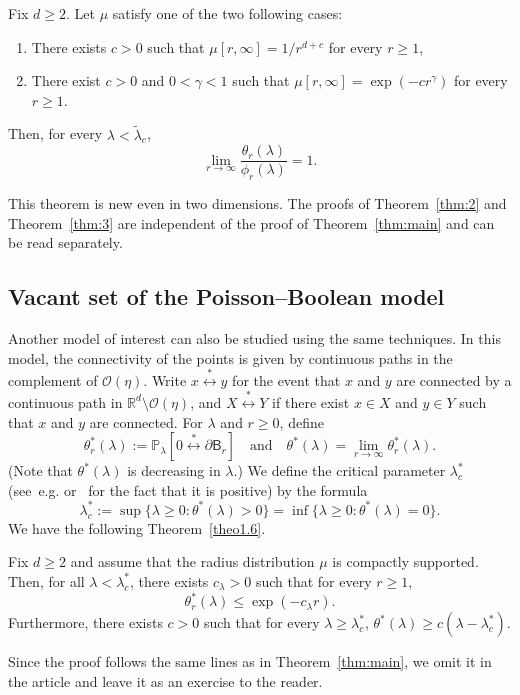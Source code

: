 \documentclass[AHL,Unicode,longabstracts]{cedram}
\newcommand*{\cenumi}{\renewcommand*{\theenumi}{C\arabic{enumi}}}
\begin{document}
\begin{theo}\label{thm:3}
Fix $d\ge2$. Let $\mu$ satisfy one of the two following cases:
\begin{enumerate}\cenumi
\item\label{C1}
There exists $c>0$ such that $\mu[r,\infty]=1/r^{d+c}$ for every $r\ge 1$,
\item\label{C2}
There exist $c>0$ and $0<\gamma<1$ such that $\mu[r,\infty]=\exp(-cr^{\gamma})$ for every $r\ge1$.
\end{enumerate}
Then, for every $\lambda<\widetilde\lambda_c$,
\[
\lim_{r\rightarrow\infty}\frac{\theta_r(\lambda)}{\phi_r(\lambda)}=1.
\]
\end{theo}

This theorem is new even in two dimensions. The proofs of Theorem~\ref{thm:2} and Theorem~\ref{thm:3} are independent of the proof of Theorem~\ref{thm:main} and can be read separately.

\subsection{Vacant set of the Poisson--Boolean model}
Another model of interest can also be studied using the same techniques. In this model, the connectivity of the points is given by continuous paths in the complement of ${\mathcal O}(\eta)$. Write $x\stackrel{*}{\longleftrightarrow}y$ for the event that $x$ and $y$ are connected by a continuous path in ${\mathbb R}^d\setminus{\mathcal O}(\eta)$, and $X\stackrel{*}{\longleftrightarrow}Y$ if there exist $x\in X $ and $y\in Y$ such that $x$ and $y$ are connected. For $\lambda$ and $r\ge0$, define
\[
\theta_r^*(\lambda):={\mathbb P}_\lambda[0\stackrel{*}\longleftrightarrow \partial\mathsf B_r]\quad\text{and}\quad\theta^*(\lambda)=\lim_{r\rightarrow\infty}\theta_r^*(\lambda).
\]
(Note that $\theta^*(\lambda)$ is decreasing in $\lambda$.) We define the critical parameter $\lambda_c^*$ (see~e.g. \cite{Pen17} or~\cite{ATT17} for the fact that it is positive) by the formula
\[
\lambda_c^*:=\sup\{\lambda\ge 0:\theta^*(\lambda)>0\}=\inf\{\lambda\ge 0:\theta^*(\lambda)=0\}.
\]
We have the following Theorem~\ref{theo1.6}.
\begin{theo}\label{theo1.6}
Fix $d\ge2$ and assume that the radius distribution $\mu$ is compactly supported. Then, for all $\lambda < \lambda_c^*$, there exists $c_\lambda >0$ such that for every $r\ge1$,
\[
\theta_r^*(\lambda) \leq \exp (-c_\lambda r).
\]
Furthermore, there exists $c>0$ such that for every $\lambda\ge\lambda_c^*$, $\theta^*(\lambda)\ge c(\lambda-\lambda_c^*).$
\end{theo}
Since the proof follows the same lines as in Theorem~\ref{thm:main}, we omit it in the article and leave it as an exercise to the reader.
\end{document}
